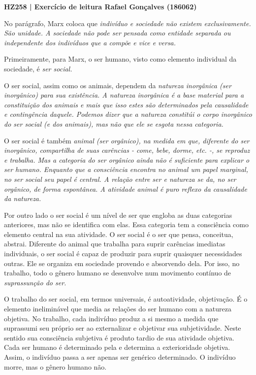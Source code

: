 \documentclass[12pt]{article}
\begin{document}
\noindent
\large\textbf{HZ258 | Exercício de leitura \hfill Rafael Gonçalves (186062)}
\break\hfill

No parágrafo, Marx coloca que \em indivíduo \em e \em sociedade \em não existem exclusivamente.
São unidade.
A sociedade não pode ser pensada como entidade separada ou independente dos indivíduos que a compõe e vice e versa.

Primeiramente, para Marx, o ser humano, visto como elemento individual da sociedade, é \em ser social\em.

O ser social, assim como os animais, dependem da \em natureza inorgânica \em (ser inorgânico) para sua existência.
A natureza inorgânica é a base material para a constituição dos animais e mais que isso estes são determinados pela causalidade e contingência daquele.
Podemos dizer que a natureza constitúi o corpo inorgânico do ser social (e dos animais), mas não que ele se esgota nessa categoria.

O ser social é também \em animal \em (ser orgânico), na medida em que, diferente do ser inorgânico, compartilha de suas carências - come, bebe, dorme, etc. -, se reproduz e \em trabalha\em.
Mas a categoria do ser orgânico ainda não é suficiente para explicar o ser humano.
Enquanto que a consciência encontra no animal um papel marginal, no ser social seu papel é central.
A relação entre ser e natureza se da, no ser orgânico, de forma espontânea.
A atividade animal é puro reflexo da causalidade da natureza.

Por outro lado o ser social é um nível de ser que engloba as duas categorias anteriores, mas não se identifica com elas.
Essa categoria tem a consciência como elemento central na sua atividade.
O ser social é o ser que pensa, conceitua, abstrai.
Diferente do animal que trabalha para suprir carências imediatas individuais, o ser social é capaz de produzir para suprir quaisquer necessidades outras.
Ele se organiza em sociedade provendo e absorvendo dela.
Por isso, no trabalho, todo o gênero humano se desenvolve num movimento contínuo de \em suprassunção \em do ser.

O trabalho do ser social, em termos universais, é autoatividade, objetivação. 
É o elemento ineliminável que media as relações do ser humano com a natureza objetiva.
No trabalho, cada indivíduo produz a si mesmo a medida que suprassumi seu próprio ser ao externalizar e objetivar sua subjetividade.
Neste sentido sua consciência subjetiva é produto tardio de sua atividade objetiva.
Cada ser humano é determinado pela e determina a exterioridade objetiva.
Assim, o indivíduo passa a ser apenas ser genérico determinado.
O indivíduo morre, mas o gênero humano não.
\end{document}
